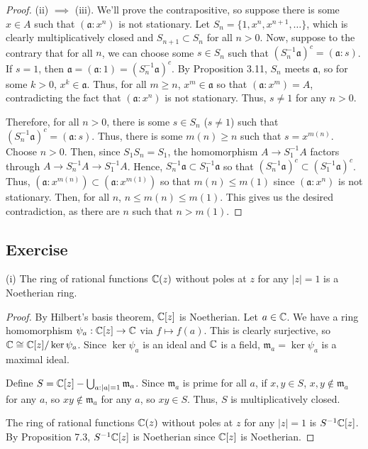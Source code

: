 \begin{proof}
(ii) $\implies$ (iii). We'll prove the contrapositive, so suppose there is some $x \in A$ such that $(\mathfrak{a}:x^n)$ is not stationary. Let $S_n = \{1,x^n,x^{n+1},\ldots\}$, which
is clearly multiplicatively closed and $S_{n+1} \subset S_n$ for all $n > 0$. Now, suppose to the contrary that for all $n$, we can choose some $s \in S_n$ such that 
$(S_n^{-1}\mathfrak{a})^c = (\mathfrak{a}:s)$. If $s = 1$, then $\mathfrak{a} = (\mathfrak{a}:1) = (S_n^{-1}\mathfrak{a})^c$. By Proposition 3.11, $S_n$ meets $\mathfrak{a}$,
so for some $k > 0$, $x^k \in \mathfrak{a}$. Thus, for all $m \ge n$, $x^m \in \mathfrak{a}$ so that $(\mathfrak{a}:x^m) = A$, contradicting the fact that $(\mathfrak{a}:x^n)$ is not
stationary. Thus, $s \neq 1$ for any $n > 0$.

Therefore, for all $n > 0$, there is some $s \in S_n$ ($s \neq 1$) such that $(S_n^{-1}\mathfrak{a})^c = (\mathfrak{a}:s)$. Thus, there is some $m(n) \ge n$ such that $s = x^{m(n)}$.
Choose $n > 0$. Then, since $S_1 S_n = S_1$, the homomorphism $A \to S_1^{-1}A$ factors through $A \to S_n^{-1}A \to S_1^{-1}A$. Hence, $S_n^{-1}\mathfrak{a} \subset S_1^{-1}\mathfrak{a}$
so that $(S_n^{-1}\mathfrak{a})^c \subset (S_1^{-1} \mathfrak{a})^c$. Thus, $(\mathfrak{a}:x^{m(n)}) \subset (\mathfrak{a}:x^{m(1)})$ so that $m(n) \le m(1)$ since $(\mathfrak{a}:x^n)$ is not
stationary. Then, for all $n$, $n \le m(n) \le m(1)$. This gives us the desired contradiction, as there are $n$ such that $n > m(1)$.
\end{proof}

\subsection{Exercise}\label{7.4}

(i) The ring of rational functions $\mathbb{C}(z)$ without poles at $z$ for any $\lvert z \rvert = 1$ is a Noetherian ring.

\begin{proof}
By Hilbert's basis theorem, $\mathbb{C}[z]$ is Noetherian. Let $a \in \mathbb{C}$. We have a ring homomorphism $\psi_a : \mathbb{C}[z] \to \mathbb{C}$ via $f \mapsto f(a)$.
This is clearly surjective, so $\mathbb{C} \cong \mathbb{C}[z]/\ker \psi_a$. Since $\ker \psi_a$ is an ideal and $\mathbb{C}$ is a field, $\mathfrak{m}_a = \ker \psi_a$ is a maximal ideal.

Define $S = \mathbb{C}[z] - \bigcup_{a : \lvert a \rvert = 1}\mathfrak{m}_a$. Since $\mathfrak{m}_a$ is prime for all $a$, if $x,y \in S$, $x,y \not\in \mathfrak{m}_a$ for any $a$,
so $xy \not\in \mathfrak{m}_a$ for any $a$, so $xy \in S$. Thus, $S$ is multiplicatively closed.

The ring of rational functions $\mathbb{C}(z)$ without poles at $z$ for any $\lvert z \rvert = 1$ is $S^{-1}\mathbb{C}[z]$. By Proposition 7.3, $S^{-1}\mathbb{C}[z]$ is Noetherian since $\mathbb{C}[z]$ is
Noetherian.
\end{proof}


